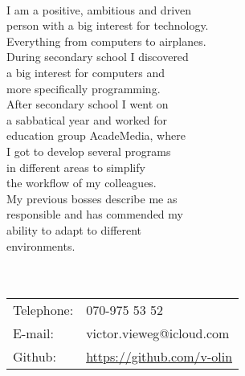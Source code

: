 \documentclass[11pt,oneside,a4paper,titlepage]{article}
\begin{document}
\begin{tcolorbox}
    \begin{minipage}[t]{8cm}
        \vspace*{-18.2pt}
        \begin{tcolorbox}[grow to left by=15pt,colframe=sup-lgray,colback=sup-lgray,sharp corners]
            {\selectfont
                \\
                I am a positive, ambitious and driven\\
                person with a big interest for technology.\\
                Everything from computers to airplanes.\\
                During secondary school I discovered\\
                a big interest for computers and\\
                more specifically programming.\\
                After secondary school I went on\\
                a sabbatical year and worked for\\
                education group AcadeMedia, where\\
                I got to develop several programs\\
                in different areas to simplify\\
                the workflow of my colleagues.\\
                My previous bosses describe me as\\
                responsible and has commended my\\
                ability to adapt to different\\
                environments.\\\\
                \\
                \vspace*{15pt}
                \begin{tabular}{l l}
                    \\Telephone: & 070-975 53 52 \\
                    E-mail: & victor.vieweg@icloud.com \\
                    Github: & \href{https://github.com/v-olin}{https://github.com/v-olin} \\

\end{tabular}}
\end{tcolorbox}
\end{minipage}
\end{tcolorbox}
\end{document}

